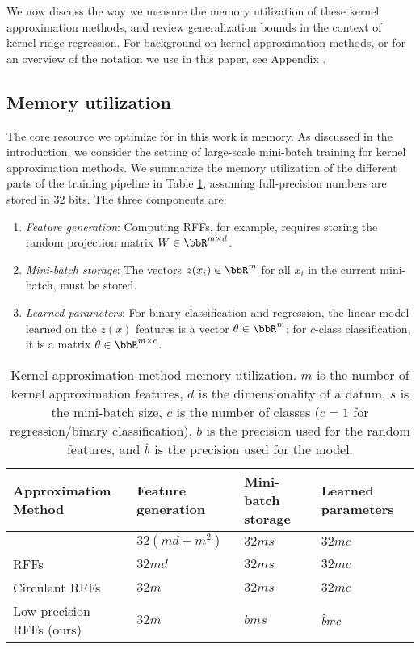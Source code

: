 We now discuss the way we measure the memory utilization of these kernel approximation methods, and review generalization bounds in the context of kernel ridge regression.  For background on kernel approximation methods, or for an overview of the notation we use in this paper, see Appendix .

\subsection{Memory utilization}
\label{subsec:memory_utils}
The core resource we optimize for in this work is memory.  As discussed in the introduction, we consider the setting of large-scale mini-batch training for kernel approximation methods. We summarize the memory utilization of the different parts of the training pipeline in Table \ref{table:mem-usage}, assuming full-precision numbers are stored in 32 bits. The three components are:
\begin{enumerate}
	\item \textit{Feature generation}: Computing RFFs, for example, requires storing the random projection matrix $W \in \RR^{m\times d}$.
	\item \textit{Mini-batch storage}: The vectors $z(x_i)\in\RR^m$ for all $x_i$ in the current mini-batch, must be stored.
	\item \textit{Learned parameters}: For binary classification and regression, the linear model learned on the $z(x)$ features is a vector $\theta \in \RR^m$; for $c$-class classification, it is a matrix $\theta \in \RR^{m\times c}$.	
\end{enumerate}

\begin{table}
	\caption{Kernel approximation method memory utilization. $m$ is the number of kernel approximation features, $d$ is the dimensionality of a datum, $s$ is the mini-batch size, $c$ is the number of classes ($c=1$ for regression/binary classification), $b$ is the precision used for the random features, and $\hat{b}$ is the precision used for the model.}
	\label{table:mem-usage}
	\centering
	\begin{tabular}{llll}
		\toprule
		Approximation Method & Feature generation & Mini-batch storage & Learned parameters \\
		\midrule
		\Nystrom \citep{nystrom} & $32(md + m^2)$ & $32ms$ & $32mc$ \\
		RFFs \citep{rahimi07random} &  $32md$ & $32ms$ & $32mc$ \\
		Circulant RFFs \citep{yu15} & $32m$ & $32ms$ & $32mc$ \\
		Low-precision RFFs (ours)& $32m$ & $bms$ & $\hat{b} mc$ \\
		\bottomrule
	\end{tabular}
\end{table}

